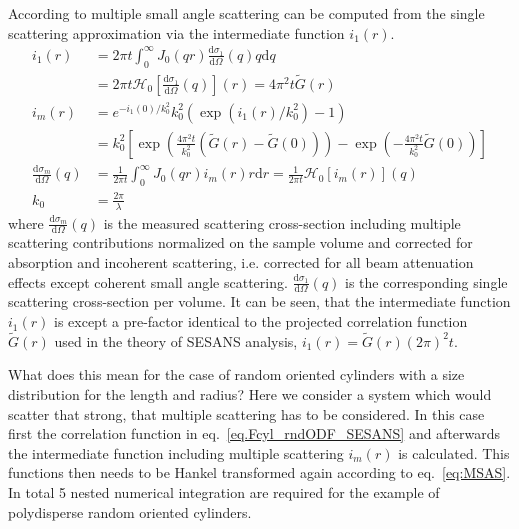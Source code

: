 According to \cite{Schelten1980,Jensen2018} multiple  small angle scattering can be computed from the single scattering approximation via the intermediate function $i_1(r)$.
\begin{align}\label{eq:MSAS_SchmatzSchelten}
 i_1(r) &= 2\pi t \int_0^\infty J_0(qr) \frac{\mathrm{d}\sigma_1}{\mathrm{d}\Omega}(q) q \mathrm{d}q \\
 &=2\pi t \mathcal{H}_0\left[\frac{\mathrm{d}\sigma_1}{\mathrm{d}\Omega}(q)\right](r)= 4\pi^2 t \tilde{G}(r)\\
 i_m(r) &= e^{-i_1(0)/k_0^2}k_0^2\left(\exp\left(i_1(r)/k_0^2\right)-1\right) \\
        &= k_0^2\left[\exp\left(\frac{4\pi^2t}{k_0^2}\left(\tilde{G}(r)-\tilde{G}(0)\right)\right)-\exp\left(-\frac{4\pi^2t}{k_0^2}\tilde{G}(0)\right)\right] \label{eq:MSASim}\\
 \frac{\mathrm{d}\sigma_m}{\mathrm{d}\Omega}(q)&= \frac{1}{2\pi t} \int_0^\infty J_0(qr) i_m(r) r \mathrm{d}r = \frac{1}{2\pi t} \mathcal{H}_0\left[i_m(r)\right](q) \label{eq:MSAS}\\
 k_0 &= \frac{2\pi}{\lambda}
\end{align}
where $\frac{\mathrm{d}\sigma_m}{\mathrm{d}\Omega}(q)$ is the measured scattering cross-section including multiple scattering contributions normalized on the sample volume and  corrected for absorption and incoherent scattering, i.e. corrected for all beam attenuation effects except coherent small angle scattering. $\frac{\mathrm{d}\sigma_1}{\mathrm{d}\Omega}(q)$ is the corresponding single scattering cross-section per volume.
It can be seen, that the intermediate function $i_1(r)$ is except a pre-factor identical to the projected correlation function $\tilde{G}(r)$ used in the theory of  SESANS analysis,
$i_1(r)=\tilde{G}(r)\left(2\pi\right)^2t$.

What does this mean for the case of random oriented cylinders with a size distribution for the length and radius? Here we consider a system which would scatter that strong, that multiple scattering has to be considered. In this case first the correlation function in eq.\ \ref{eq.Fcyl_rndODF_SESANS} and afterwards the intermediate function including multiple scattering $i_m(r)$ is calculated. This functions then needs to be Hankel transformed again according to eq.\ \ref{eq:MSAS}. In total 5 nested numerical integration are required for the example of polydisperse random oriented cylinders.


